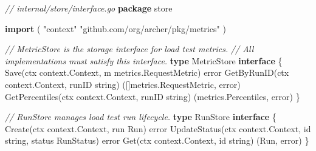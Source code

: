 \documentclass[
]{article}
\newenvironment{Shaded}{}{}
\newcommand{\CommentTok}[1]{\textcolor[rgb]{0.38,0.63,0.69}{\textit{#1}}}
\newcommand{\DataTypeTok}[1]{\textcolor[rgb]{0.56,0.13,0.00}{#1}}
\newcommand{\KeywordTok}[1]{\textcolor[rgb]{0.00,0.44,0.13}{\textbf{#1}}}
\newcommand{\NormalTok}[1]{#1}
\newcommand{\OperatorTok}[1]{\textcolor[rgb]{0.40,0.40,0.40}{#1}}
\newcommand{\StringTok}[1]{\textcolor[rgb]{0.25,0.44,0.63}{#1}}
\begin{document}
\begin{Shaded}
\begin{Highlighting}[]
\CommentTok{// internal/store/interface.go}
\KeywordTok{package}\NormalTok{ store}

\KeywordTok{import} \OperatorTok{(}
    \StringTok{"context"}
    \StringTok{"github.com/org/archer/pkg/metrics"}
\OperatorTok{)}

\CommentTok{// MetricStore is the storage interface for load test metrics.}
\CommentTok{// All implementations must satisfy this interface.}
\KeywordTok{type}\NormalTok{ MetricStore }\KeywordTok{interface} \OperatorTok{\{}
\NormalTok{    Save}\OperatorTok{(}\NormalTok{ctx context}\OperatorTok{.}\NormalTok{Context}\OperatorTok{,}\NormalTok{ m metrics}\OperatorTok{.}\NormalTok{RequestMetric}\OperatorTok{)} \DataTypeTok{error}
\NormalTok{    GetByRunID}\OperatorTok{(}\NormalTok{ctx context}\OperatorTok{.}\NormalTok{Context}\OperatorTok{,}\NormalTok{ runID }\DataTypeTok{string}\OperatorTok{)} \OperatorTok{([]}\NormalTok{metrics}\OperatorTok{.}\NormalTok{RequestMetric}\OperatorTok{,} \DataTypeTok{error}\OperatorTok{)}
\NormalTok{    GetPercentiles}\OperatorTok{(}\NormalTok{ctx context}\OperatorTok{.}\NormalTok{Context}\OperatorTok{,}\NormalTok{ runID }\DataTypeTok{string}\OperatorTok{)} \OperatorTok{(}\NormalTok{metrics}\OperatorTok{.}\NormalTok{Percentiles}\OperatorTok{,} \DataTypeTok{error}\OperatorTok{)}
\OperatorTok{\}}

\CommentTok{// RunStore manages load test run lifecycle.}
\KeywordTok{type}\NormalTok{ RunStore }\KeywordTok{interface} \OperatorTok{\{}
\NormalTok{    Create}\OperatorTok{(}\NormalTok{ctx context}\OperatorTok{.}\NormalTok{Context}\OperatorTok{,}\NormalTok{ run Run}\OperatorTok{)} \DataTypeTok{error}
\NormalTok{    UpdateStatus}\OperatorTok{(}\NormalTok{ctx context}\OperatorTok{.}\NormalTok{Context}\OperatorTok{,}\NormalTok{ id }\DataTypeTok{string}\OperatorTok{,}\NormalTok{ status RunStatus}\OperatorTok{)} \DataTypeTok{error}
\NormalTok{    Get}\OperatorTok{(}\NormalTok{ctx context}\OperatorTok{.}\NormalTok{Context}\OperatorTok{,}\NormalTok{ id }\DataTypeTok{string}\OperatorTok{)} \OperatorTok{(}\NormalTok{Run}\OperatorTok{,} \DataTypeTok{error}\OperatorTok{)}
\OperatorTok{\}}
\end{Highlighting}
\end{Shaded}
\end{document}
